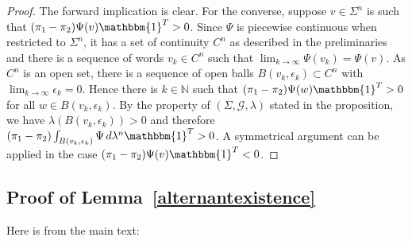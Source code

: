 \documentclass[a4paper,UKenglish,cleveref, autoref,mathscr]{lipics-v2019}
\newcommand{\NN}{\mathbb{N}}
\newcommand{\GG}{\mathscr{G}}
\newcommand{\1}{\mathbbm{1}}
\begin{document}
\begin{proof}
The forward implication is clear.
For the converse, suppose $v \in \Sigma^n$ is such that $(\pi_1 - \pi_2) \Psi(v) \1^T > 0$.
Since $\Psi$ is piecewise continuous when restricted to $\Sigma^n$, it has a set of continuity $C^n$ as described in the preliminaries and there is a sequence of words $v_k \in C^n$ such that $\lim_{k \rightarrow \infty} \Psi(v_k) = \Psi(v)$.
As $C^n$ is an open set, there is a sequence of open balls $B(v_k, \epsilon_k) \subset C^n$ with $\lim_{k \to \infty} \epsilon_k = 0$.
Hence there is $k \in \NN$ such that $(\pi_1 - \pi_2) \Psi(w) \1^T > 0$ for all $w \in B(v_k, \epsilon_k)$.
By the property of $(\Sigma, \GG, \lambda)$ stated in the proposition, we have $\lambda(B(v_k, \epsilon_k)) > 0$
 and therefore $(\pi_1 - \pi_2) \int_{B(v_k, \epsilon_k)} \Psi\, d\lambda^n \1^T > 0$. A symmetrical argument can be applied in the case $(\pi_1 - \pi_2) \Psi(v) \1^T < 0$.
\end{proof}

\subsection{Proof of Lemma~\ref{alternantexistence}}
Here is  from the main text:
\alternantexistence*
\end{document}
